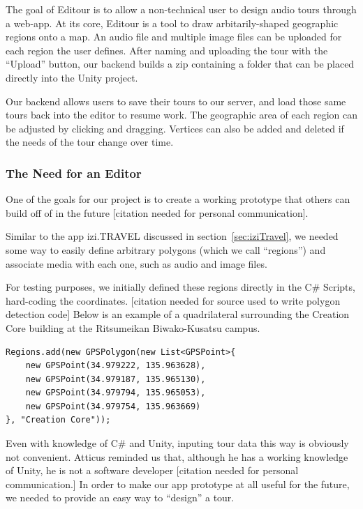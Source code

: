 \documentclass[a4paper, 10pt, american, titlepage]{article}
\begin{document}
The goal of Editour is to allow a non-technical user to design audio tours
through a web-app. At its core, Editour is a tool to draw arbitarily-shaped
geographic regions onto a map. An audio file and multiple image files can be
uploaded for each region the user defines. After naming and uploading the tour
with the ``Upload'' button, our backend builds a zip containing a folder that can
be placed directly into the Unity project.

Our backend allows users to save their tours to our server, and load those same
tours back into the editor to resume work.  The geographic area of each region
can be adjusted by clicking and dragging. Vertices can also be added and
deleted if the needs of the tour change over time.

\subsubsection{The Need for an Editor}

One of the goals for our project is to create a working prototype that others
can build off of in the future [citation needed for personal communication].

Similar to the app izi.TRAVEL discussed in section~\ref{sec:iziTravel}, we
needed some way to easily define arbitrary polygons (which we call ``regions'')
and associate media with each one, such as audio and image files.

For testing purposes, we initially defined these regions directly in the C\#
Scripts, hard-coding the coordinates. [citation needed for source used to
write polygon detection code] Below is an example of a quadrilateral
surrounding the Creation Core building at the Ritsumeikan Biwako-Kusatsu
campus.

\begin{verbatim}
Regions.add(new GPSPolygon(new List<GPSPoint>{
    new GPSPoint(34.979222, 135.963628),
    new GPSPoint(34.979187, 135.965130),
    new GPSPoint(34.979794, 135.965053),
    new GPSPoint(34.979754, 135.963669)
}, "Creation Core"));
\end{verbatim}

Even with knowledge of C\# and Unity, inputing tour data this way is obviously
not convenient. Atticus reminded us that, although he has a working knowledge
of Unity, he is not a software developer [citation needed for personal
communication.] In order to make our app prototype at all useful for the
future, we needed to provide an easy way to ``design'' a tour.
\end{document}
